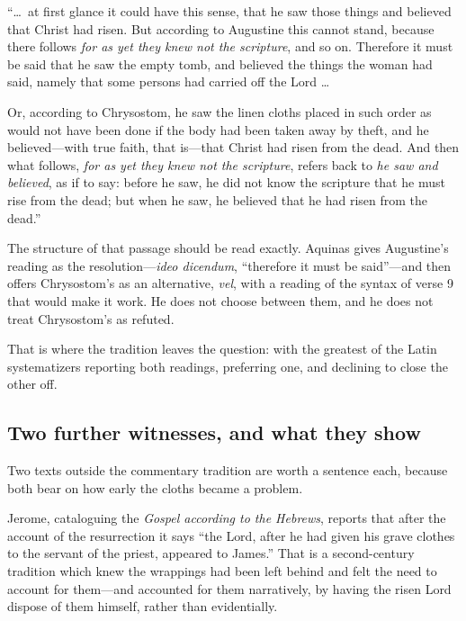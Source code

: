 \begin{studyframe}\small
``\ldots\ at first glance it could have this sense, that he saw those things
and believed that Christ had risen. But according to Augustine this cannot
stand, because there follows \emph{for as yet they knew not the scripture}, and
so on. Therefore it must be said that he saw the empty tomb, and believed the
things the woman had said, namely that some persons had carried off the Lord
\ldots

Or, according to Chrysostom, he saw the linen cloths placed in such order as
would not have been done if the body had been taken away by theft, and he
believed---with true faith, that is---that Christ had risen from the dead. And
then what follows, \emph{for as yet they knew not the scripture}, refers back to
\emph{he saw and believed}, as if to say: before he saw, he did not know the
scripture that he must rise from the dead; but when he saw, he believed that he
had risen from the dead.''
\end{studyframe}

The structure of that passage should be read exactly. Aquinas gives Augustine's
reading as the resolution---\emph{ideo dicendum}, ``therefore it must be
said''---and then offers Chrysostom's as an alternative, \emph{vel}, with a
reading of the syntax of verse 9 that would make it work. He does not choose
between them, and he does not treat Chrysostom's as refuted.

That is where the tradition leaves the question: with the greatest of the Latin
systematizers reporting both readings, preferring one, and declining to close
the other off.

\subsection{Two further witnesses, and what they show}

Two texts outside the commentary tradition are worth a sentence each, because
both bear on how early the cloths became a problem.

Jerome, cataloguing the \emph{Gospel according to the Hebrews}, reports that
after the account of the resurrection it says ``the Lord, after he had given
his grave clothes to the servant of the priest, appeared to
James.'' That is a second-century tradition
which knew the wrappings had been left behind and felt the need to account for
them---and accounted for them narratively, by having the risen Lord dispose of
them himself, rather than evidentially.

